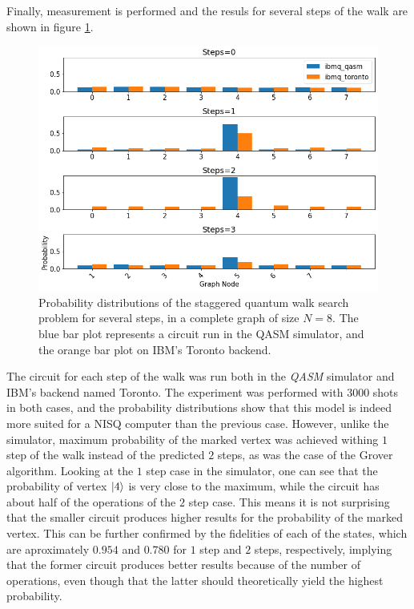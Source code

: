 \documentclass[../../dissertation.tex]{subfiles}
\begin{document}
Finally, measurement is performed and the resuls for several steps of the walk
are shown in figure \ref{fig:stagSearchResultsToronto}.  
\begin{figure}[!h]
	\centering
	\includegraphics[scale=0.40]{img/Qiskit/StaggeredQW/Search/stagSearchToronto_N3_S0123.png}
	\caption{Probability distributions of the staggered quantum walk search problem for several steps, in a complete graph of size $N=8$. The blue bar plot represents a circuit run in the QASM simulator, and the orange bar plot on IBM's Toronto backend.}
	\label{fig:stagSearchResultsToronto}
\end{figure}
The circuit for each step of the walk was run both in the \textit{QASM}
simulator and IBM's backend named Toronto. The experiment was performed with
$3000$ shots in both cases, and the probability distributions show that this
model is indeed more suited for a NISQ computer than the previous case.
However, unlike the simulator, maximum probability of the marked vertex was
achieved withing $1$ step of the walk instead of the predicted $2$ steps, as
was the case of the Grover algorithm. Looking at the $1$ step case in the
simulator, one can see that the probability of vertex $\ket{4}$ is very close
to the maximum, while the circuit has about half of the operations of the $2$
step case. This means it is not surprising that the smaller circuit produces
higher results for the probability of the marked vertex. 
This can be further confirmed by the fidelities of each of the states, which
are aproximately $0.954$ and $0.780$ for $1$ step and $2$ steps, respectively,
implying that the former circuit produces better results because of the number
of operations, even though that the latter should theoretically yield the
highest probability.\par 
\end{document}

